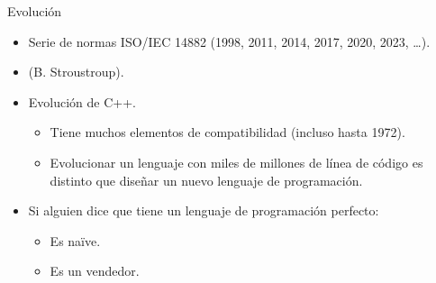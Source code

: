 \begin{frame}{Evolución}
\vspace{-0.5em}
\begin{itemize}
  \item Serie de normas ISO/IEC 14882 (1998, 2011, 2014, 2017, 2020, 2023, \ldots).
  \item {} (B. Stroustroup).
  \item Evolución de C++.
    \begin{itemize}
      \item Tiene muchos elementos de compatibilidad (incluso hasta 1972).
      \item Evolucionar un lenguaje con miles de millones de línea de código es
      distinto que diseñar un nuevo lenguaje de programación.
    \end{itemize}
  \item Si alguien dice que tiene un lenguaje de programación perfecto:
    \begin{itemize}
      \item Es na\"{i}ve.
      \item Es un vendedor.
    \end{itemize}
\end{itemize}
\end{frame}

